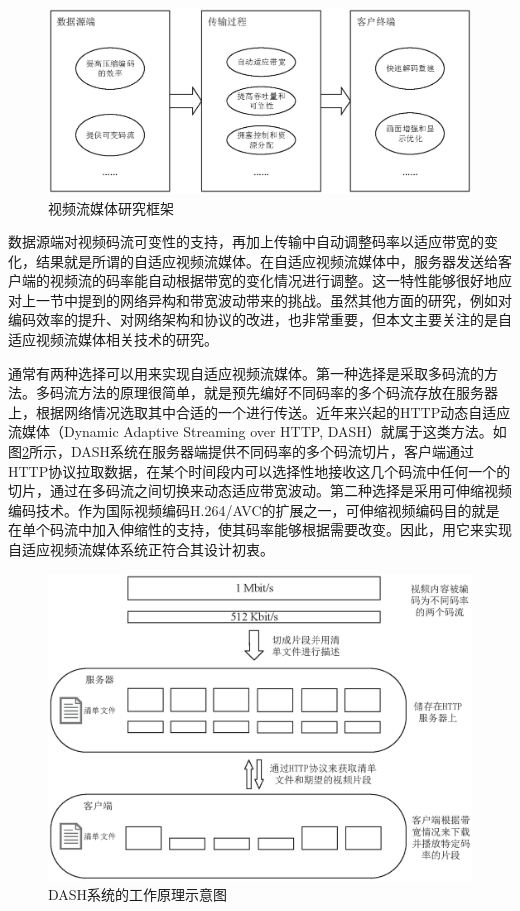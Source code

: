 \begin{figure}[h]
	\centering
	\includegraphics[width = 1.0\linewidth]{eps/research-framework}
	\caption{视频流媒体研究框架 \label{fig:research-framework}}
\end{figure}

数据源端对视频码流可变性的支持，再加上传输中自动调整码率以适应带宽的变化，结果就是所谓的自适应视频流媒体。在自适应视频流媒体中，服务器发送给客户端的视频流的码率能自动根据带宽的变化情况进行调整。这一特性能够很好地应对上一节中提到的网络异构和带宽波动带来的挑战。虽然其他方面的研究，例如对编码效率的提升、对网络架构和协议的改进，也非常重要，但本文主要关注的是自适应视频流媒体相关技术的研究。

通常有两种选择可以用来实现自适应视频流媒体。第一种选择是采取多码流的方法。多码流方法的原理很简单，就是预先编好不同码率的多个码流存放在服务器上，根据网络情况选取其中合适的一个进行传送。近年来兴起的HTTP动态自适应流媒体（Dynamic Adaptive Streaming over HTTP,  DASH）\supercite{Sodagar2011}就属于这类方法。如图\ref{fig:DASH}所示，DASH系统在服务器端提供不同码率的多个码流切片，客户端通过HTTP协议拉取数据，在某个时间段内可以选择性地接收这几个码流中任何一个的切片，通过在多码流之间切换来动态适应带宽波动。第二种选择是采用可伸缩视频编码\supercite{SVC-Overview}技术。作为国际视频编码H.264/AVC\supercite{H.264}的扩展之一，可伸缩视频编码目的就是在单个码流中加入伸缩性的支持，使其码率能够根据需要改变。因此，用它来实现自适应视频流媒体系统正符合其设计初衷。

\begin{figure}[t]
	\centering
	\includegraphics[width = 1.0\linewidth]{eps/DASH}
	\caption{DASH系统的工作原理示意图\label{fig:DASH}}
\end{figure}


